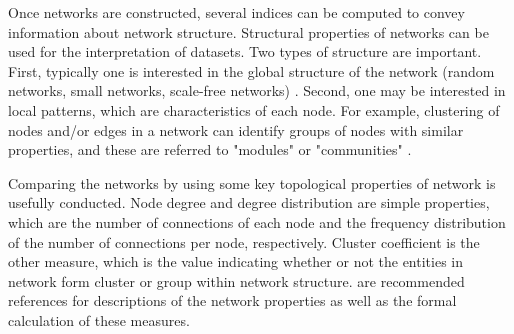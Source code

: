 Once networks are constructed, several indices can be computed to convey information about network structure. Structural properties of networks can be used for the interpretation of datasets. Two types of structure are important. First, typically one is interested in the global structure of the network (random networks, small networks, scale-free networks) . Second, one may be interested in local patterns, which are characteristics of each node. For example, clustering of nodes and/or edges in a network can identify groups of nodes with similar properties, and these are referred to "modules" or "communities" .

Comparing the networks by using some key topological properties of network is usefully conducted. Node degree and degree distribution are simple properties, which are the number of connections of each node and the frequency distribution of the number of connections per node, respectively. Cluster coefficient is the other measure, which is the value indicating whether or not the entities in network form cluster or group within network structure.  are recommended references for descriptions of the network properties as well as the formal calculation of these measures.





